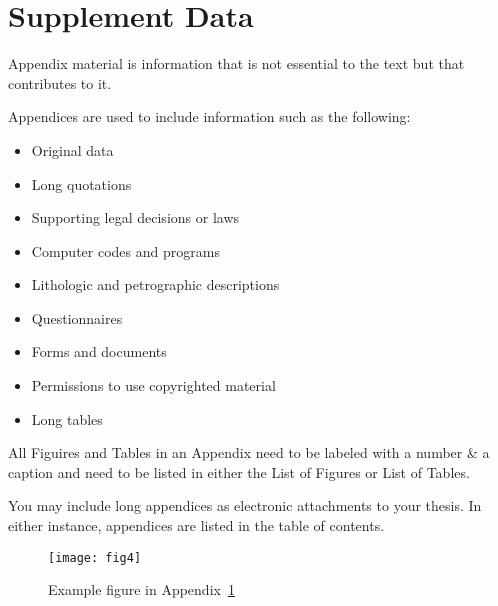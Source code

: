 \chapter{Supplement Data}\label{appendix:1}

Appendix material is information that is not
essential to the text but that contributes to it.

Appendices are used to include information such as the following:

\begin{itemize}
	\item Original data
	\item Long quotations 
	\item Supporting legal decisions or laws 
	\item Computer codes and programs 
	\item Lithologic and petrographic descriptions
	\item Questionnaires 	
	\item Forms and documents 
	\item Permissions to use copyrighted material
	\item Long tables
\end{itemize}


All Figuires and  Tables in an Appendix need to be labeled with a number \& a caption and need to be listed in either the List of Figures or List of Tables.

You may include long appendices as electronic attachments to your thesis. In either instance, appendices are listed in the table of contents.

\begin{figure}[h]
	\centering
	\texttt{[image: fig4]}
	\caption{Example figure in Appendix~\ref{appendix:1}}
\end{figure}